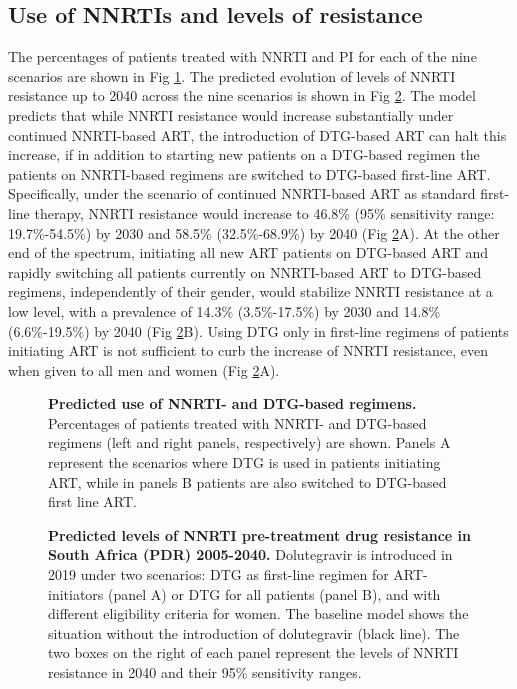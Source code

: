 \documentclass[10pt,letterpaper]{article}
\newcommand{\numberda}{46.8\% }
\newcommand{\numberdb}{19.7\%-54.5\%}
\newcommand{\numberea}{58.5\% }
\newcommand{\numbereb}{32.5\%-68.9\%}
\newcommand{\numberfa}{14.3\% }
\newcommand{\numberfb}{3.5\%-17.5\%}
\newcommand{\numberga}{14.8\% }
\newcommand{\numbergb}{6.6\%-19.5\%}
\begin{document}
\subsection*{Use of NNRTIs and levels of resistance}
The percentages of patients treated with NNRTI and PI for each of the nine scenarios are shown in Fig \ref{fig2}. The predicted evolution of levels of NNRTI resistance up to 2040 across the nine scenarios is shown in Fig \ref{fig3}. The model predicts that while NNRTI resistance would increase substantially under continued NNRTI-based ART, the introduction of DTG-based ART can halt this increase, if in addition to starting new patients on a DTG-based regimen the patients on NNRTI-based regimens are switched to DTG-based first-line ART. Specifically, under the scenario of continued NNRTI-based ART as standard first-line therapy, NNRTI resistance would increase to \numberda (95\% sensitivity range: \numberdb) by 2030 and \numberea (\numbereb) by 2040 (Fig \ref{fig3}A). At the other end of the spectrum, initiating all new ART patients on DTG-based ART and rapidly switching all patients currently on NNRTI-based ART to DTG-based regimens, independently of their gender, would stabilize NNRTI resistance at a low level, with a prevalence of \numberfa (\numberfb) by 2030 and \numberga (\numbergb) by 2040 (Fig \ref{fig3}B). Using DTG only in first-line regimens of patients initiating ART is not sufficient to curb the increase of NNRTI resistance, even when given to all men and women (Fig \ref{fig3}A).

\begin{figure}[h]
   \vspace{0.5cm}
   \caption{{\bf Predicted use of NNRTI- and DTG-based regimens.}
Percentages of patients treated with NNRTI- and DTG-based regimens (left and right panels, respectively) are shown. Panels A represent the scenarios where DTG is used in patients initiating ART, while in panels B patients are also switched to DTG-based first line ART.}\label{fig2}
\end{figure}

\begin{figure}[h]
   \vspace{0.5cm}
   \caption{{\bf Predicted levels of NNRTI pre-treatment drug resistance in South Africa (PDR) 2005-2040.}
Dolutegravir is introduced in 2019 under two scenarios: DTG as first-line regimen for ART-initiators (panel A) or DTG for all patients (panel B), and with different eligibility criteria for women. The baseline model shows the situation without the introduction of dolutegravir (black line). The two boxes on the right of each panel represent the levels of NNRTI resistance in 2040 and their 95\% sensitivity ranges.}\label{fig3}
\end{figure}
\end{document}
